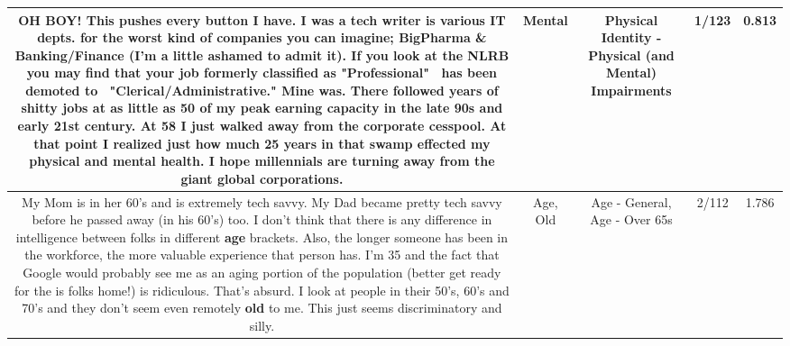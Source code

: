\documentclass[11pt]{article}
\newlength\mylength
\begin{document}
\begin{center}
\begin{longtable}{|C{.65\mylength}|C{.30\mylength}|C{.12\mylength}|C{.12\mylength}|C{.12\mylength}|}
  \small OH BOY! This pushes every button I have. I was a tech writer is various IT depts. for the worst kind of companies you can imagine; BigPharma \& Banking/Finance (I'm a little ashamed to admit it). If you look at the NLRB you may find that your job formerly classified as "Professional"  has been demoted to  "Clerical/Administrative." Mine was. There followed years of shitty jobs at as little as 50 of my peak earning capacity in the late 90s and early 21st century. At 58 I just walked away from the corporate cesspool. At that point I realized just how much 25 years in that swamp effected my physical and \textbf{mental} health. I hope millennials are turning away from the giant global corporations.\normalsize   & Mental & Physical Identity - Physical (and Mental) Impairments & 1/123 & 0.813 \\  \hline
  \small My Mom is in her 60's and is extremely tech savvy. My Dad became pretty tech savvy before he passed away (in his 60's) too. I don't think that there is any difference in intelligence between folks in different \textbf{age} brackets. Also, the longer someone has been in the workforce, the more valuable experience that person has. I'm 35 and the fact that Google would probably see me as an aging portion of the population (better get ready for the is folks home!) is ridiculous. That's absurd. I look at people in their 50's, 60's and 70's and they don't seem even remotely \textbf{old} to me. This just seems discriminatory and silly.\normalsize   & Age, Old & Age - General, Age - Over 65s & 2/112 & 1.786 \\  \hline

\end{longtable}
\end{center}
\end{document}
